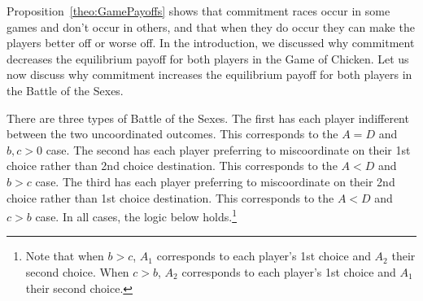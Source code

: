 \documentclass[letterpaper]{article}
\theoremstyle{definition}
\begin{document}

Proposition~\ref{theo:GamePayoffs} shows that commitment races occur in some games and don't occur in others, and that when they do occur they can make the players better off or worse off. In the introduction, we discussed why commitment decreases the equilibrium payoff for both players in the Game of Chicken. Let us now discuss why commitment increases the equilibrium payoff for both players in the Battle of the Sexes.

There are three types of Battle of the Sexes. The first has each player indifferent between the two uncoordinated outcomes. This corresponds to the $A = D$ and $b, c > 0$ case. The second has each player preferring to miscoordinate on their 1st choice rather than 2nd choice destination. This corresponds to the $A < D$ and $b > c$ case. The third has each player preferring to miscoordinate on their 2nd choice rather than 1st choice destination. This corresponds to the $A < D$ and $c > b$ case. In all cases, the logic below holds.\footnote{Note that when $b > c$, $A_1$ corresponds to each player's 1st choice and $A_2$ their second choice. When $c > b$, $A_2$ corresponds to each player's 1st choice and $A_1$ their second choice.}

\end{document}
